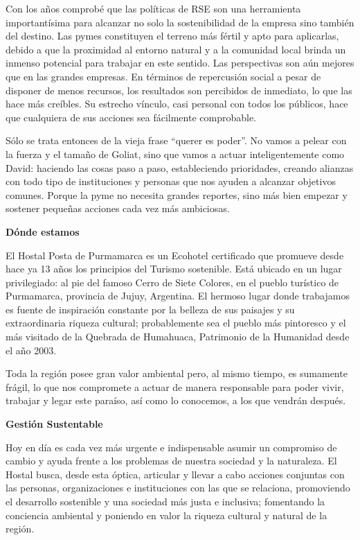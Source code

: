 \begin{fullwidth}
Con los años comprobé que las políticas de RSE son una herramienta
importantísima para alcanzar no solo la sostenibilidad de la empresa
sino también del destino. Las pymes constituyen el terreno más fértil y
apto para aplicarlas, debido a que la proximidad al entorno natural y a
la comunidad local brinda un inmenso potencial para trabajar en este
sentido. Las perspectivas son aún mejores que en las grandes empresas.
En términos de repercusión social a pesar de disponer de menos recursos,
los resultados son percibidos de inmediato, lo que las hace más
creíbles. Su estrecho vínculo, casi personal con todos los públicos,
hace que cualquiera de sus acciones sea fácilmente comprobable.

Sólo se trata entonces de la vieja frase ``querer es poder''. No vamos a
pelear con la fuerza y el tamaño de Goliat, sino que vamos a actuar
inteligentemente como David: haciendo las cosas paso a paso,
estableciendo prioridades, creando alianzas con todo tipo de
instituciones y personas que nos ayuden a alcanzar objetivos comunes.
Porque la pyme no necesita grandes reportes, sino más bien empezar y
sostener pequeñas acciones cada vez más ambiciosas.

\textbf{Dónde estamos}

El Hostal Posta de Purmamarca es un Ecohotel certificado que promueve
desde hace ya 13 años los principios del Turismo sostenible. Está
ubicado en un lugar privilegiado: al pie del famoso Cerro de Siete
Colores, en el pueblo turístico de Purmamarca, provincia de Jujuy,
Argentina. El hermoso lugar donde trabajamos es fuente de inspiración
constante por la belleza de sus paisajes y su extraordinaria riqueza
cultural; probablemente sea el pueblo más pintoresco y el más visitado
de la Quebrada de Humahuaca, Patrimonio de la Humanidad desde el año
2003.

Toda la región posee gran valor ambiental pero, al mismo tiempo, es
sumamente frágil, lo que nos compromete a actuar de manera responsable
para poder vivir, trabajar y legar este paraíso, así como lo conocemos,
a los que vendrán después.

\textbf{Gestión Sustentable }

Hoy en día es cada vez más urgente e indispensable asumir un compromiso
de cambio y ayuda frente a los problemas de nuestra sociedad y la
naturaleza. El Hostal busca, desde esta óptica, articular y llevar a
cabo acciones conjuntas con las personas, organizaciones e instituciones
con las que se relaciona, promoviendo el desarrollo sostenible y una
sociedad más justa e inclusiva; fomentando la conciencia ambiental y
poniendo en valor la riqueza cultural y natural de la región.


\end{fullwidth}
